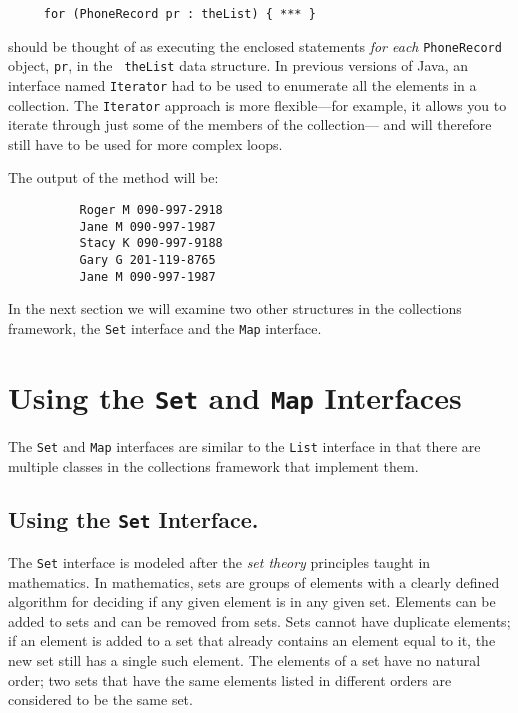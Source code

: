 \begin{jjjlisting}
\begin{lstlisting}
     for (PhoneRecord pr : theList) { *** }
\end{lstlisting}
\end{jjjlisting}

\noindent should be thought of as executing the enclosed statements
{\em for each} {\tt PhoneRecord} object, {\tt pr}, in the {\tt
theList} data structure.  In previous versions of Java, an interface
named {\tt Iterator} had to be used to enumerate all the elements in a
collection.  The {\tt Iterator} approach is more flexible---for
example, it allows you to iterate through just some of the members of
the collection--- and will therefore still have to be used for more
complex loops.

The output of the method will be:
\begin{jjjlisting}
\begin{lstlisting}
          Roger M 090-997-2918
          Jane M 090-997-1987
          Stacy K 090-997-9188
          Gary G 201-119-8765
          Jane M 090-997-1987
\end{lstlisting}
\end{jjjlisting}

In the next section we will examine two other structures in the collections
framework, the {\tt Set} interface and the {\tt Map} interface.


\section{ Using the {\tt Set} and {\tt Map} Interfaces}

The {\tt Set} and {\tt Map} interfaces are similar to the {\tt List}
interface in that there are multiple classes in the collections framework
that implement them.

\subsection{Using the {\tt Set} Interface.}

The {\tt Set} interface is modeled after the {\em set theory}
principles taught in mathematics.  In mathematics, sets are groups of
elements with a clearly defined algorithm for deciding if any given
element is in any given set.  Elements can be added to sets and can be
removed from sets. Sets cannot have duplicate elements; if an element
is added to a set that already contains an element equal to it, the
new set still has a single such element.  The elements of a set have
no natural order; two sets that have the same elements listed in
different orders are considered to be the same set.

